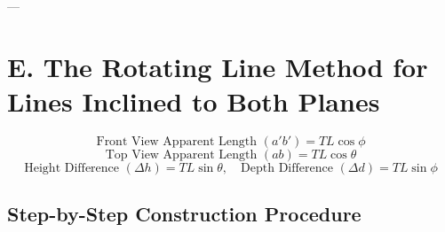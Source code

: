 ---

\section{E. The Rotating Line Method for Lines Inclined to Both Planes}

\begin{keyequation}
\begin{equation}
    \text{Front View Apparent Length } (a'b') = TL \cos \phi
\end{equation}
\begin{equation}
    \text{Top View Apparent Length } (ab) = TL \cos \theta
\end{equation}
$$\text{Height Difference } (\Delta h) = TL \sin \theta, \quad \text{Depth Difference } (\Delta d) = TL \sin \phi$$
\end{keyequation}

\subsection{Step-by-Step Construction Procedure}

